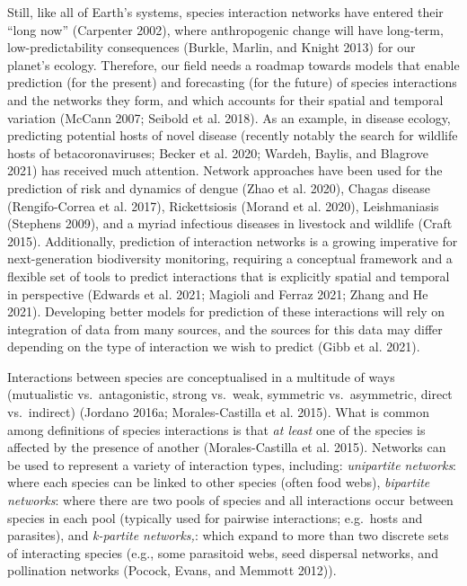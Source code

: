\documentclass[11pt]{article}
\begin{document}
Still, like all of Earth's systems, species interaction networks have
entered their ``long now'' (Carpenter 2002), where anthropogenic change
will have long-term, low-predictability consequences (Burkle, Marlin,
and Knight 2013) for our planet's ecology. Therefore, our field needs a
roadmap towards models that enable prediction (for the present) and
forecasting (for the future) of species interactions and the networks
they form, and which accounts for their spatial and temporal variation
(McCann 2007; Seibold et al. 2018). As an example, in disease ecology,
predicting potential hosts of novel disease (recently notably the search
for wildlife hosts of betacoronaviruses; Becker et al. 2020; Wardeh,
Baylis, and Blagrove 2021) has received much attention. Network
approaches have been used for the prediction of risk and dynamics of
dengue (Zhao et al. 2020), Chagas disease (Rengifo-Correa et al. 2017),
Rickettsiosis (Morand et al. 2020), Leishmaniasis (Stephens 2009), and a
myriad infectious diseases in livestock and wildlife (Craft 2015).
Additionally, prediction of interaction networks is a growing imperative
for next-generation biodiversity monitoring, requiring a conceptual
framework and a flexible set of tools to predict interactions that is
explicitly spatial and temporal in perspective (Edwards et al. 2021;
Magioli and Ferraz 2021; Zhang and He 2021). Developing better models
for prediction of these interactions will rely on integration of data
from many sources, and the sources for this data may differ depending on
the type of interaction we wish to predict (Gibb et al. 2021).

Interactions between species are conceptualised in a multitude of ways
(mutualistic vs.~antagonistic, strong vs.~weak, symmetric
vs.~asymmetric, direct vs.~indirect) (Jordano 2016a; Morales-Castilla et
al. 2015). What is common among definitions of species interactions is
that \emph{at least} one of the species is affected by the presence of
another (Morales-Castilla et al. 2015). Networks can be used to
represent a variety of interaction types, including: \emph{unipartite
networks}: where each species can be linked to other species (often food
webs), \emph{bipartite networks}: where there are two pools of species
and all interactions occur between species in each pool (typically used
for pairwise interactions; e.g.~hosts and parasites), and
\emph{k-partite networks,}: which expand to more than two discrete sets
of interacting species (e.g., some parasitoid webs, seed dispersal
networks, and pollination networks (Pocock, Evans, and Memmott 2012)).
\end{document}

